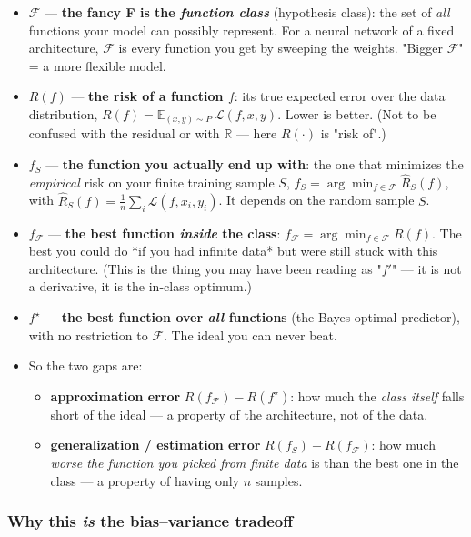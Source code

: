 \documentclass[11pt]{article}
\begin{document}
\begin{itemize}
\item $\mathcal F$ --- \textbf{the fancy F is the \emph{function class}} (hypothesis class):
the set of \emph{all} functions your model can possibly represent. For a
neural network of a fixed architecture, $\mathcal F$ is every function
you get by sweeping the weights. "Bigger $\mathcal F$" = a more flexible
model.
\item $R(f)$ --- \textbf{the risk of a function $f$}: its true expected error over the
data distribution, $R(f) = \mathbb E_{(x,y)\sim P}\,\mathcal L(f,x,y)$.
Lower is better. (Not to be confused with the residual or with $\mathbb
  R$ --- here $R(\cdot)$ is "risk of".)
\item $f_S$ --- \textbf{the function you actually end up with}: the one that minimizes
the \emph{empirical} risk on your finite training sample $S$, $f_S =
  \arg\min_{f\in\mathcal F}\hat R_S(f)$, with $\hat R_S(f)=\frac1n\sum_i
  \mathcal L(f,x_i,y_i)$. It depends on the random sample $S$.
\item $f_{\mathcal F}$ --- \textbf{the best function \emph{inside} the class}: $f_{\mathcal
  F} = \arg\min_{f\in\mathcal F} R(f)$. The best you could do *if you had
infinite data* but were still stuck with this architecture. (This is the
thing you may have been reading as "$f'$" --- it is not a derivative, it is
the in-class optimum.)
\item $f^\star$ --- \textbf{the best function over \emph{all} functions} (the Bayes-optimal
predictor), with no restriction to $\mathcal F$. The ideal you can never
beat.
\item So the two gaps are:
\begin{itemize}
\item \textbf{approximation error} $R(f_{\mathcal F}) - R(f^\star)$: how much the
\emph{class itself} falls short of the ideal --- a property of the
architecture, not of the data.
\item \textbf{generalization / estimation error} $R(f_S) - R(f_{\mathcal F})$: how
much \emph{worse the function you picked from finite data} is than the best
one in the class --- a property of having only $n$ samples.
\end{itemize}
\end{itemize}
\subsubsection*{Why this \emph{is} the bias--variance tradeoff}
\end{document}
